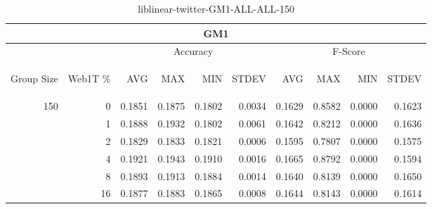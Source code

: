 \begin{center}
\begin{table}[htbp]
\begin{tabular}{ | r | r | r | r | r | r | r | r | r | r |}
\hline
\multicolumn{10}{|c|}{GM1}\\
\hline
 & & \multicolumn{4}{|c|}{Accuracy} & \multicolumn{4}{|c|}{F-Score}\\ \cline{3-10}
\begin{sideways}Group Size\end{sideways} & \begin{sideways}Web1T \%\end{sideways} & \begin{sideways}AVG\end{sideways} & \begin{sideways}MAX\end{sideways} & \begin{sideways}MIN\end{sideways} & \begin{sideways}STDEV\end{sideways} & \begin{sideways}AVG\end{sideways} & \begin{sideways}MAX\end{sideways} & \begin{sideways}MIN\end{sideways} & \begin{sideways}STDEV\end{sideways}\\
\hline
\multirow{5}{*}{150}
 & 0 & 0.1851 & 0.1875 & 0.1802 & 0.0034 & 0.1629 & 0.8582 & 0.0000 & 0.1623\\ \cline{2-10}
 & 1 & 0.1888 & 0.1932 & 0.1802 & 0.0061 & 0.1642 & 0.8212 & 0.0000 & 0.1636\\ \cline{2-10}
 & 2 & 0.1829 & 0.1833 & 0.1821 & 0.0006 & 0.1595 & 0.7807 & 0.0000 & 0.1575\\ \cline{2-10}
 & 4 & 0.1921 & 0.1943 & 0.1910 & 0.0016 & 0.1665 & 0.8792 & 0.0000 & 0.1594\\ \cline{2-10}
 & 8 & 0.1893 & 0.1913 & 0.1884 & 0.0014 & 0.1640 & 0.8139 & 0.0000 & 0.1650\\ \cline{2-10}
 & 16 & 0.1877 & 0.1883 & 0.1865 & 0.0008 & 0.1644 & 0.8143 & 0.0000 & 0.1614\\ \cline{2-10}
\hline
\end{tabular}
\caption{liblinear-twitter-GM1-ALL-ALL-150}
\label{table:liblinear-twitter-GM1-ALL-ALL-150}
\end{table}
\end{center}

